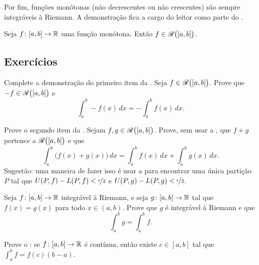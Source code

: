 Por fim, funções monótonas (não decrescentes ou não crescentes) são sempre
integráveis à Riemann. A demonstração fica a cargo do leitor como parte do
.

\begin{prop} \label{prop:monotoneintegrable}
Seja $f \colon [a,b] \to {\mathbb{R}}$ uma função monótona. Então $f \in
{\mathscr{R}}\bigl([a,b]\bigr)$.
\end{prop}

\subsection{Exercícios}

\begin{exercise} \label{exercise:proofoflinpropparti}
Complete a demonstração do primeiro item da
. Seja $f \in {\mathscr{R}}\bigl([a,b]\bigr)$.
Prove que $-f \in {\mathscr{R}}\bigl([a,b]\bigr)$ e
\begin{equation*}
\int_a^b - f(x) \,dx = - \int_a^b f(x) \,dx .
\end{equation*}
\end{exercise}

\begin{exercise} \label{exercise:proofoflinproppartii}
Prove o segundo item da .
Sejam $f,g \in {\mathscr{R}}\bigl([a,b]\bigr)$.
Prove, sem usar a , que $f+g$ pertence a
${\mathscr{R}}\bigl([a,b]\bigr)$ e que
\begin{equation*}
\int_a^b \bigl( f(x)+g(x) \bigr) \,dx = 
\int_a^b f(x) \,dx 
+
\int_a^b g(x) \,dx .
\end{equation*}
Sugestão: uma maneira de fazer isso é usar a  para encontrar
uma única partição $P$ tal que $U(P,f)-L(P,f) < \nicefrac{\epsilon}{2}$ e
$U(P,g)-L(P,g) < \nicefrac{\epsilon}{2}$.
\end{exercise}

\begin{exercise} \label{exercise:changeendpointsintegral}
Seja $f \colon [a,b] \to {\mathbb{R}}$ integrável à Riemann, e seja
$g \colon [a,b] \to {\mathbb{R}}$ tal que $f(x) = g(x)$ para todo $x \in (a,b)$.
Prove que $g$ é integrável à Riemann e que
\begin{equation*}
\int_a^b g = \int_a^b f.
\end{equation*}
\end{exercise}

\begin{exercise}
Prove o \emph{}:
se $f \colon [a,b] \to {\mathbb{R}}$ é contínua, então existe
$c \in [a,b]$ tal que $\int_a^b f = f(c)(b-a)$.
\end{exercise}

